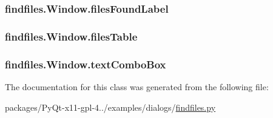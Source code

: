 \subsubsection[{files\+Found\+Label}]{\setlength{\rightskip}{0pt plus 5cm}findfiles.\+Window.\+files\+Found\+Label}\label{classfindfiles_1_1Window_a019a4298a6bf4e62b8b9e302ca997be6}
\hypertarget{classfindfiles_1_1Window_a1fc5065f32a8a7d8c628607289fe865a}{}
\subsubsection[{files\+Table}]{\setlength{\rightskip}{0pt plus 5cm}findfiles.\+Window.\+files\+Table}\label{classfindfiles_1_1Window_a1fc5065f32a8a7d8c628607289fe865a}
\hypertarget{classfindfiles_1_1Window_afb10703557b8398022dad68574b25e6e}{}
\subsubsection[{text\+Combo\+Box}]{\setlength{\rightskip}{0pt plus 5cm}findfiles.\+Window.\+text\+Combo\+Box}\label{classfindfiles_1_1Window_afb10703557b8398022dad68574b25e6e}


The documentation for this class was generated from the following file\+:\begin{DoxyCompactItemize}
\item 
packages/\+Py\+Qt-\/x11-\/gpl-\/4../examples/dialogs/\hyperlink{findfiles_8py}{findfiles.\+py}\end{DoxyCompactItemize}

